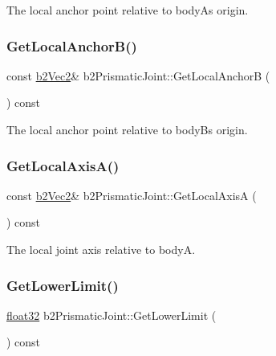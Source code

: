 The local anchor point relative to bodyA\textquotesingle{}s origin. 

\mbox{\label{classb2_prismatic_joint_ab9c2a0fbf075454320e87648750668b0}} 
\subsubsection{\texorpdfstring{GetLocalAnchorB()}{GetLocalAnchorB()}}
{\footnotesize\ttfamily const \mbox{\hyperlink{structb2_vec2}{b2\+Vec2}}\& b2\+Prismatic\+Joint\+::\+Get\+Local\+AnchorB (\begin{DoxyParamCaption}{ }\end{DoxyParamCaption}) const\hspace{0.3cm}{\ttfamily [inline]}}



The local anchor point relative to bodyB\textquotesingle{}s origin. 

\mbox{\label{classb2_prismatic_joint_a54d51d09f3c327c5c4238e054e2a3a76}} 
\subsubsection{\texorpdfstring{GetLocalAxisA()}{GetLocalAxisA()}}
{\footnotesize\ttfamily const \mbox{\hyperlink{structb2_vec2}{b2\+Vec2}}\& b2\+Prismatic\+Joint\+::\+Get\+Local\+AxisA (\begin{DoxyParamCaption}{ }\end{DoxyParamCaption}) const\hspace{0.3cm}{\ttfamily [inline]}}



The local joint axis relative to bodyA. 

\mbox{\label{classb2_prismatic_joint_a10a2d3c03164190d279fa3c72eafb49e}} 
\subsubsection{\texorpdfstring{GetLowerLimit()}{GetLowerLimit()}}
{\footnotesize\ttfamily \mbox{\hyperlink{b2_settings_8h_aacdc525d6f7bddb3ae95d5c311bd06a1}{float32}} b2\+Prismatic\+Joint\+::\+Get\+Lower\+Limit (\begin{DoxyParamCaption}{ }\end{DoxyParamCaption}) const}



